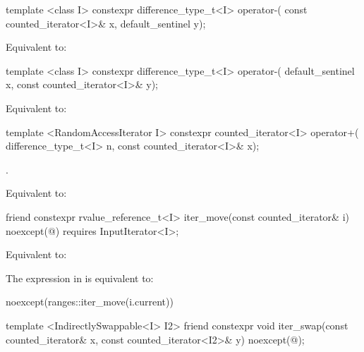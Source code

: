 \begin{itemdecl}
template <class I>
  constexpr difference_type_t<I> operator-(
    const counted_iterator<I>& x, default_sentinel y);
\end{itemdecl}

\begin{itemdescr}
\pnum
\effects Equivalent to:
\end{itemdescr}

\begin{itemdecl}
template <class I>
  constexpr difference_type_t<I> operator-(
    default_sentinel x, const counted_iterator<I>& y);
\end{itemdecl}

\begin{itemdescr}
\pnum
\effects Equivalent to:
\end{itemdescr}

%
%
\begin{itemdecl}
template <RandomAccessIterator I>
  constexpr counted_iterator<I> operator+(
    difference_type_t<I> n, const counted_iterator<I>& x);
\end{itemdecl}

\begin{itemdescr}
\pnum
\requires {}.

\pnum
\effects Equivalent to:
\end{itemdescr}

%
%
\begin{itemdecl}
friend constexpr rvalue_reference_t<I> iter_move(const counted_iterator& i)
  noexcept(@\seebelow@)
    requires InputIterator<I>;
\end{itemdecl}

\begin{itemdescr}
\pnum
\effects Equivalent to: 

\pnum
\remarks The expression in  is equivalent to:
\begin{codeblock}
noexcept(ranges::iter_move(i.current))
\end{codeblock}
\end{itemdescr}

%
%
\begin{itemdecl}
template <IndirectlySwappable<I> I2>
  friend constexpr void iter_swap(const counted_iterator& x, const counted_iterator<I2>& y)
    noexcept(@\seebelow@);
\end{itemdecl}

